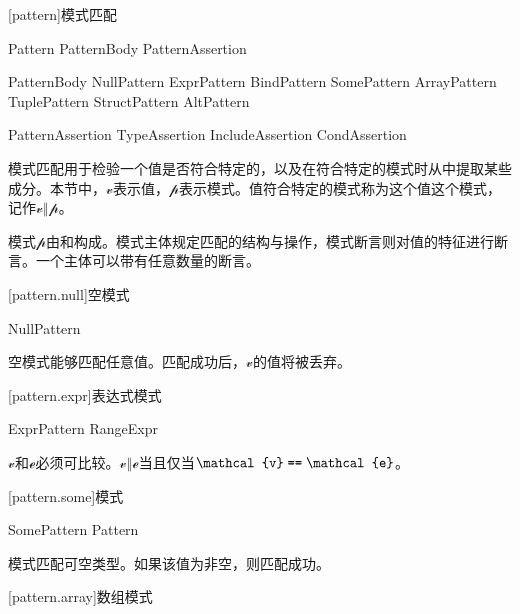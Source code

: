 
[pattern]{模式匹配}

\begin{bnf}{Pattern}
    PatternBody PatternAssertion\bnfs
\end{bnf}

\begin{bnf}{PatternBody}
    NullPattern \br
    ExprPattern \br
    BindPattern \br
    SomePattern \br
    ArrayPattern \br
    TuplePattern \br
    StructPattern \br
    AltPattern
\end{bnf}

\begin{bnf}{PatternAssertion}
    TypeAssertion \br
    IncludeAssertion \br
    CondAssertion
\end{bnf}

\pnum
模式匹配用于检验一个值是否符合特定的，以及在符合特定的模式时从中提取某些成分。本节中，$\mathcal{v}$表示值，$\mathcal{p}$表示模式。值符合特定的模式称为这个值这个模式，记作$\mathcal{v}\mathrel{\Vert}\mathcal{p}$。

\pnum
模式$\mathcal{p}$由和构成。模式主体规定匹配的结构与操作，模式断言则对值的特征进行断言。一个主体可以带有任意数量的断言。

[pattern.null]{空模式}

\begin{bnf}{NullPattern}
    \tcode{_}
\end{bnf}

\pnum
空模式能够匹配任意值。匹配成功后，$\mathcal{v}$的值将被丢弃。

[pattern.expr]{表达式模式}

\begin{bnf}{ExprPattern}
    RangeExpr
\end{bnf}

\pnum
$\mathcal{v}$和$\mathcal{e}$必须可比较。$\mathcal{v}\mathrel{\Vert}\mathcal{e}$当且仅当$\mathcal{v}\mathrel{\tcode{==}}\mathcal{e}$。

[pattern.some]{模式}

\begin{bnf}{SomePattern}
     Pattern
\end{bnf}

\pnum
{}模式匹配可空类型。如果该值为非空，则匹配成功。

[pattern.array]{数组模式}

